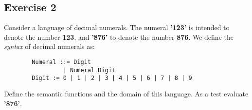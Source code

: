 \documentclass [11pt, a4wide, twoside]{article}
\begin{document}
\subsection*{Exercise 2}

Consider a language of decimal numerals. The numeral \textbf{'123'} is intended to denote the number \textbf{123}, and \textbf{'876'} to denote the number \textbf{876}. We define the \emph{syntax} of decimal numerals as:

\begin{small}
\begin{verbatim}
        Numeral ::= Digit
                 | Numeral Digit
        Digit := 0 | 1 | 2 | 3 | 4 | 5 | 6 | 7 | 8 | 9
\end{verbatim}
\end{small}

\noindent Define the semantic functions and the domain of this language. As a test evaluate \textbf{'876'}.
\\\\

\end{document}
